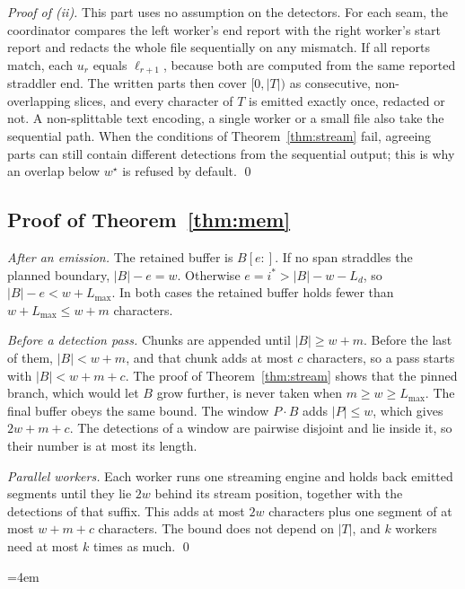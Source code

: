 \documentclass[pdflatex,sn-mathphys-num]{sn-jnl}
\theoremstyle{\ssThmStyle}
\theoremstyle{\ssDefStyle}
\begin{document}
\emph{Proof of (ii).} This part uses no assumption on the detectors. For each seam, the coordinator compares the left worker's end report with the right worker's start report and redacts the whole file sequentially on any mismatch. If all reports match, each $u_r$ equals $\ell_{r+1}$, because both are computed from the same reported straddler end. The written parts then cover $[0, |T|)$ as consecutive, non-overlapping slices, and every character of $T$ is emitted exactly once, redacted or not. A non-splittable text encoding, a single worker or a small file also take the sequential path. When the conditions of Theorem~\ref{thm:stream} fail, agreeing parts can still contain different detections from the sequential output; this is why an overlap below $w^{\star}$ is refused by default.
\qed

\subsection{Proof of Theorem~\ref{thm:mem}}

\emph{After an emission.} The retained buffer is $B[e{:}]$. If no span straddles the planned boundary, $|B| - e = w$. Otherwise $e = i^{*} > |B| - w - L_d$, so $|B| - e < w + L_{\max}$. In both cases the retained buffer holds fewer than $w + L_{\max} \le w + m$ characters.

\emph{Before a detection pass.} Chunks are appended until $|B| \ge w + m$. Before the last of them, $|B| < w + m$, and that chunk adds at most $c$ characters, so a pass starts with $|B| < w + m + c$. The proof of Theorem~\ref{thm:stream} shows that the pinned branch, which would let $B$ grow further, is never taken when $m \ge w \ge L_{\max}$. The final buffer obeys the same bound. The window $P \cdot B$ adds $|P| \le w$, which gives $2w + m + c$. The detections of a window are pairwise disjoint and lie inside it, so their number is at most its length.

\emph{Parallel workers.} Each worker runs one streaming engine and holds back emitted segments until they lie $2w$ behind its stream position, together with the detections of that suffix. This adds at most $2w$ characters plus one segment of at most $w + m + c$ characters. The bound does not depend on $|T|$, and $k$ workers need at most $k$ times as much.
\qed

\begingroup\emergencystretch=4em

\endgroup
\end{document}
